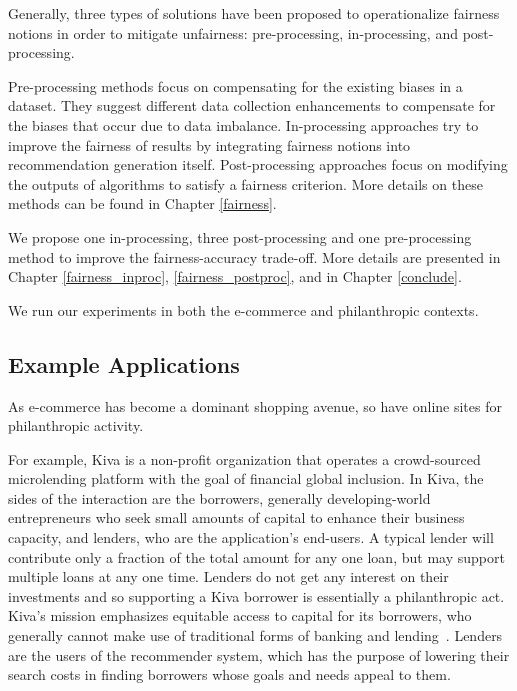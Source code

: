 Generally, three types of solutions have been proposed to operationalize fairness notions in order to mitigate  unfairness: pre-processing, in-processing, and post-processing.

Pre-processing methods focus on compensating for the existing biases in a dataset. They suggest different data collection enhancements to compensate for the biases that occur due to data imbalance. In-processing approaches try to improve the fairness of results by integrating fairness notions into recommendation generation itself. Post-processing approaches focus on modifying the outputs of algorithms to satisfy a fairness criterion. More details on these methods can be found in Chapter \ref{fairness}.

We propose one in-processing, three post-processing and one pre-processing method to improve the fairness-accuracy trade-off. More details are presented in Chapter \ref{fairness_inproc}, \ref{fairness_postproc}, and in Chapter \ref{conclude}.


We run our experiments in both the e-commerce and philanthropic contexts.
\subsection{Example Applications}


As e-commerce has become a dominant shopping avenue, so have online sites for philanthropic activity. 

For example, Kiva is a non-profit organization that operates a crowd-sourced microlending platform with the goal of financial global inclusion. In Kiva, the sides of the interaction are the borrowers, generally developing-world entrepreneurs who seek small amounts of capital to enhance their business capacity, and lenders, who are the application's end-users. A typical lender will contribute only a fraction of the total amount for any one loan, but may support multiple loans at any one time. Lenders do not get any interest on their investments and so supporting a Kiva borrower is essentially a philanthropic act. Kiva's mission emphasizes equitable access to capital for its borrowers, who generally cannot make use of traditional forms of banking and lending~\cite{Choo_understanding_kiva}. Lenders are the users of the recommender system, which has the purpose of lowering their search costs in finding borrowers whose goals and needs appeal to them. 

